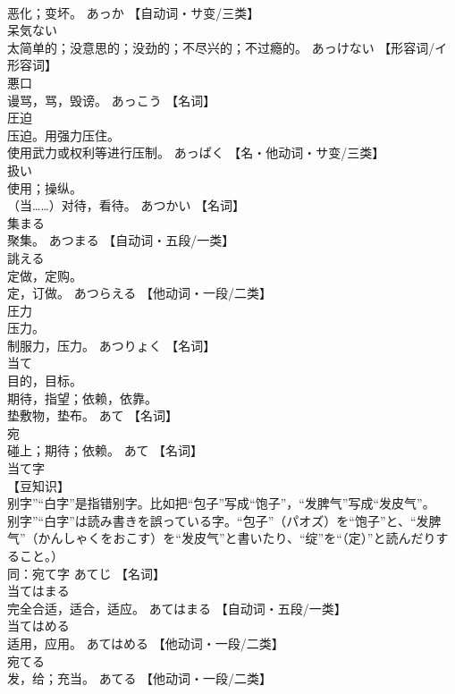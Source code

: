 \documentclass[8pt]{extreport}
\begin{document}
\begin{CJK}{UTF8}{min}
\\	恶化；变坏。	あっか		【自动词・サ变/三类】
\\	呆気ない	
\\	太简单的；没意思的；没劲的；不尽兴的；不过瘾的。	あっけない		【形容词/イ形容词】
\\	悪口	
\\	谩骂，骂，毁谤。	あっこう		【名词】
\\	圧迫	
\\	压迫。用强力压住。 
\\	使用武力或权利等进行压制。	あっぱく		【名・他动词・サ变/三类】
\\	扱い	
\\	使用；操纵。 
\\	（当……）对待，看待。	あつかい		【名词】
\\	集まる	
\\	聚集。	あつまる		【自动词・五段/一类】
\\	誂える	
\\	定做，定购。 
\\	定，订做。	あつらえる		【他动词・一段/二类】
\\	圧力	
\\	压力。 
\\	制服力，压力。	あつりょく		【名词】
\\	当て	
\\	目的，目标。 
\\	期待，指望；依赖，依靠。 
\\	垫敷物，垫布。	あて		【名词】
\\	宛	
\\	碰上；期待；依赖。	あて		【名词】
\\	当て字	
\\	【豆知识】 
\\	别字”“白字”是指错别字。比如把“包子”写成“饱子”，“发脾气”写成“发皮气”。
\\	别字”“白字”は読み書きを誤っている字。“包子”（パオズ）を“饱子”と、“发脾气”（かんしゃくをおこす）を“发皮气”と書いたり、“绽”を“（定）”と読んだりすること。） 
\\	同：宛て字	あてじ		【名词】
\\	当てはまる	
\\	完全合适，适合，适应。	あてはまる		【自动词・五段/一类】
\\	当てはめる	
\\	适用，应用。	あてはめる		【他动词・一段/二类】
\\	宛てる	
\\	发，给；充当。	あてる		【他动词・一段/二类】

\end{CJK}
\end{document}
